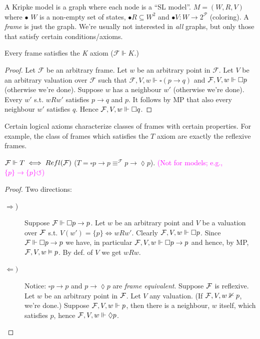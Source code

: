 A Kripke model is a graph where each node is a ``SL model''. $M = (W, R, V)$ where $\bullet$ $W$ is a non-empty set of states, $\bullet R \subseteq W^2$ and $\bullet V : W \to 2^{\mathcal P}$ (coloring). A \textit{frame} is just the graph. We're usually not interested in \textit{all} graphs, but only those that satisfy certain conditions/axioms. 

\begin{proposition}Every frame satisfies the \textit{K} axiom ($\mathcal F \Vdash K$.)
\end{proposition}

\begin{proof} Let $\mathcal F$ be an arbitrary frame. Let $w$ be an arbitrary point in $\mathcal F$. Let $V$ be an arbitrary valuation over $\mathcal F$ such that $\mathcal F, V, w \Vdash \square(p \to q)$ and $\mathcal F, V, w \Vdash \square p$ (otherwise we're done). Suppose $w$ has a neighbour $w'$ (otherwise we're done). Every $w'$ s.t. $wRw'$ satisfies $p \to q$ and $p$. It follows by MP that also every neighbour $w'$ satisfies $q$. Hence $\mathcal F, V, w \Vdash \square q$.
\end{proof}

Certain logical axioms characterize classes of frames with certain properties. For example, the class of frames which satisfies the $T$ axiom are exactly the reflexive frames.

\begin{proposition} $\mathcal F \Vdash T \iff Refl(\mathcal F)$ ($T =\square p \to p \equiv^{\mathcal F} p \to \lozenge p$). \textcolor{magenta}{(Not for models; e.g., $\{p\} \to \{p\}\circlearrowleft$)}
\end{proposition}

\begin{proof} Two directions:  
\begin{description}
\item[$\Rightarrow$)] Suppose $\mathcal F \Vdash \square p \to p$. Let $w$ be an arbitrary point and $V$ be a valuation over $\mathcal F$ s.t. $V(w') = \{p\} \iff wRw'$. Clearly $\mathcal F,V,w \Vdash \square p$. Since $\mathcal F \Vdash \square p \to p$ we have, in particular $\mathcal F, V, w\Vdash \square p \to p$ and hence, by MP, $\mathcal F, V, w \vDash p$. By def. of $V$ we get $wRw$.
\item[$\Leftarrow)$] Notice: $\square p \to p$ and $p \to \lozenge p$ are \textit{frame equivalent}. Suppose $\mathcal F$ is reflexive. Let $w$ be an arbitrary point in $\mathcal F$. Let $V$ any valuation. (If $\mathcal F, V, w \nVdash p$, we're done.) Suppose $\mathcal F, V, w \Vdash p$, then there is a neighbour, $w$ itself, which satisfies $p$, hence $\mathcal F, V, w \Vdash \lozenge p$.
\end{description}
\end{proof}


